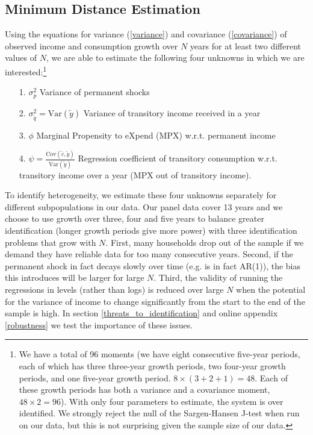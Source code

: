 \documentclass[titlepage]{\econtex}\newcommand{\texname}{ConsumptionHeterogeneity}
\begin{document}
	\subsection{Minimum Distance Estimation}
	Using the equations for variance (\ref{variance}) and covariance (\ref{covariance}) of observed income and consumption growth over $N$ years for at least two different values of $N$, we are able to estimate the following four unknowns in which we are interested:\footnote{We have a total of 96 moments (we have eight consecutive five-year periods, each of which has three three-year growth periods, two four-year growth periods, and one five-year growth period. $8\times(3+2+1)=48$. Each of these growth periods has both a variance and a covariance moment, $48\times 2 = 96$). With only four parameters to estimate, the system is over identified. We strongly reject the null of the Sargen-Hansen J-test when run on our data, but this is not surprising given the sample size of our data.}
	\begin{itemize}
		\item[1.] $\sigma^2_p$ Variance of permanent shocks
		\item[2.] $\sigma^2_{\tilde{q}} = \mathrm{Var}(\tilde{y})$ Variance of transitory income received in a year
		\item[3.] $\phi$ Marginal Propensity to eXpend (MPX) w.r.t. permanent income
		\item[4.] $\psi = \frac{\mathrm{Cov}(\tilde{c},\tilde{y})}{\mathrm{Var}(\tilde{y})}$ Regression coefficient of transitory consumption w.r.t. transitory income over a year (MPX out of transitory income).
	\end{itemize}
	To identify heterogeneity, we estimate these four unknowns separately for different subpopulations in our data. Our panel data cover 13 years and we choose to use growth over three, four and five years to balance greater identification (longer growth periods give more power) with three identification problems that grow with $N$. First, many households drop out of the sample if we demand they have reliable data for too many consecutive years. Second, if the permanent shock in fact decays slowly over time (e.g. is in fact AR(1)), the bias this introduces will be larger for large $N$. Third, the validity of running the regressions in levels (rather than logs) is reduced over large $N$ when the potential for the variance of income to change significantly from the start to the end of the sample is high. In section \ref{threats_to_identification} and online appendix \ref{robustness} we test the importance of these issues.
	
\end{document}
